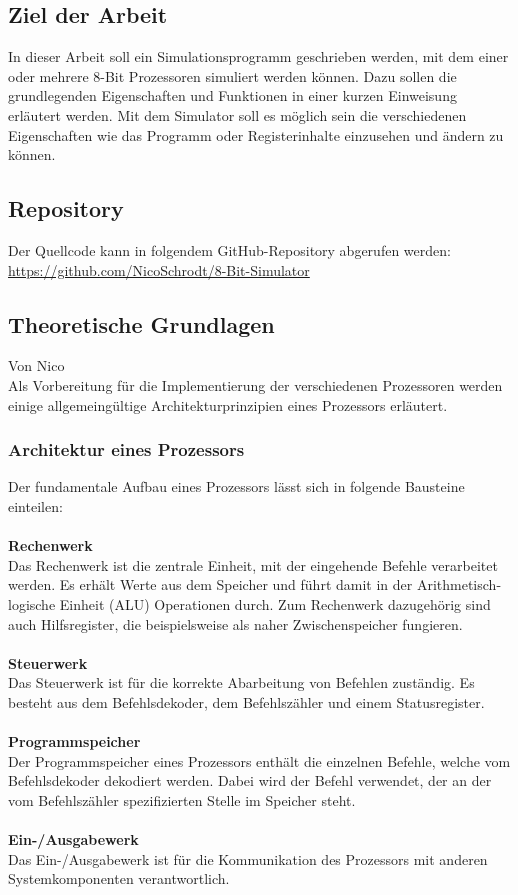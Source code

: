 \documentclass[12pt]{article}
\begin{document}
\subsection{Ziel der Arbeit}
In dieser Arbeit soll ein Simulationsprogramm geschrieben werden, mit dem einer oder mehrere 8-Bit Prozessoren simuliert werden können. Dazu sollen die grundlegenden Eigenschaften und Funktionen in einer kurzen Einweisung erläutert werden. Mit dem Simulator soll es möglich sein die verschiedenen Eigenschaften wie das Programm oder Registerinhalte einzusehen und ändern zu können. 
\subsection{Repository}
Der Quellcode kann in folgendem GitHub-Repository abgerufen werden:\\ \url{https://github.com/NicoSchrodt/8-Bit-Simulator}

\newpage

\subsection{Theoretische Grundlagen}
Von Nico\\

\noindent
Als Vorbereitung für die Implementierung der verschiedenen Prozessoren werden einige allgemeingültige Architekturprinzipien eines Prozessors erläutert. 

\subsubsection{Architektur eines Prozessors}
Der fundamentale Aufbau eines Prozessors lässt sich in folgende Bausteine einteilen:\\ \\
\textbf{Rechenwerk}\\
Das Rechenwerk ist die zentrale Einheit, mit der eingehende Befehle verarbeitet werden. Es erhält Werte aus dem Speicher und führt damit in der Arithmetisch-logische Einheit (ALU) Operationen durch. Zum Rechenwerk dazugehörig sind auch Hilfsregister, die beispielsweise als naher Zwischenspeicher fungieren.\\ \\
\textbf{Steuerwerk}\\
Das Steuerwerk ist für die korrekte Abarbeitung von Befehlen zuständig. Es besteht aus dem Befehlsdekoder, dem Befehlszähler und einem Statusregister.\\ \\
\textbf{Programmspeicher}\\
Der Programmspeicher eines Prozessors enthält die einzelnen Befehle, welche vom Befehlsdekoder dekodiert werden. Dabei wird der Befehl verwendet, der an der vom Befehlszähler spezifizierten Stelle im Speicher steht.\\ \\
\textbf{Ein-/Ausgabewerk}\\
Das Ein-/Ausgabewerk ist für die Kommunikation des Prozessors mit anderen Systemkomponenten verantwortlich.\\
\end{document}
